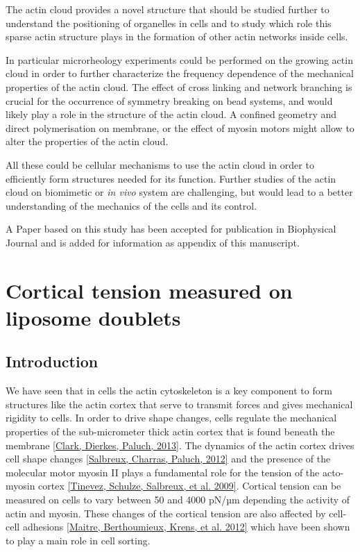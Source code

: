 \documentclass[A4paperpaper,11pt,english]{sphinxmanual}
\begin{document}
The actin cloud provides a novel structure that should be studied further to
understand the positioning of organelles in cells and to study which role this sparse
actin structure plays in the formation of other actin networks inside cells.

In particular microrheology experiments could be performed on the growing actin
cloud in order to further characterize the frequency dependence of the mechanical
properties  of the actin cloud. The effect of cross linking and network
branching is crucial for the occurrence of symmetry breaking on bead systems, and
would likely play a role in the structure of the actin cloud. A confined
geometry and direct polymerisation on membrane, or the effect of myosin motors
might allow to alter the properties of the actin cloud.

All these could be cellular mechanisms to use the actin cloud in order
to efficiently form structures needed for its function.
Further studies of the actin cloud on biomimetic or \emph{in vivo} system are
challenging, but would lead to a better understanding of the mechanics of the
cells and its control.

A Paper based on this study has been accepted for publication in Biophysical
Journal and is added for information as appendix of this manuscript.


\chapter{Cortical tension measured on liposome doublets}
\label{index-latex:lib-doub}\label{index-latex:cortical-tension-measured-on-liposome-doublets}\label{index-latex::doc}

\section{Introduction}
\label{index-latex:introduction}
We have seen that in cells the actin cytoskeleton is a key component to form
structures like the actin cortex that serve to transmit forces and gives
mechanical rigidity to cells. In order to drive shape changes, cells regulate the
mechanical properties of the sub-micrometer thick actin cortex that is found
beneath the membrane {\hyperref[index-latex:clark2013]{{[}Clark, Dierkes, Paluch,  2013{]}}}. The dynamics of the actin cortex
drives cell shape changes {\hyperref[index-latex:salbreux2012b]{{[}Salbreux, Charras, Paluch,  2012{]}}} and the presence of the
molecular motor myosin II plays a fundamental role for the tension of the
acto-myosin cortex {\hyperref[index-latex:tinevez2009]{{[}Tinevez, Schulze, Salbreux,  et al.  2009{]}}}. Cortical tension can be measured on
cells to vary between 50 and 4000 pN/µm depending the activity of actin and
myosin.  These changes of the cortical tension are also affected by cell-cell
adhesions {\hyperref[index-latex:maitre2012]{{[}Maitre, Berthoumieux, Krens,  et al.  2012{]}}} which have been shown to play a main role in cell
sorting.
\end{document}
